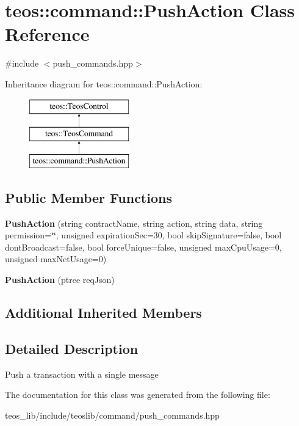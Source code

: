 \hypertarget{classteos_1_1command_1_1_push_action}{}\section{teos\+:\+:command\+:\+:Push\+Action Class Reference}
\label{classteos_1_1command_1_1_push_action}


{\ttfamily \#include $<$push\+\_\+commands.\+hpp$>$}

Inheritance diagram for teos\+:\+:command\+:\+:Push\+Action\+:\begin{figure}[H]
\begin{center}
\leavevmode
\includegraphics[height=3.000000cm]{classteos_1_1command_1_1_push_action}
\end{center}
\end{figure}
\subsection*{Public Member Functions}
\begin{DoxyCompactItemize}
\item 
\mbox{\label{classteos_1_1command_1_1_push_action_a97565647ccfdf55a8e0e5a6d2ed25d32}} 
{\bfseries Push\+Action} (string contract\+Name, string action, string data, string permission=\char`\"{}\char`\"{}, unsigned expiration\+Sec=30, bool skip\+Signature=false, bool dont\+Broadcast=false, bool force\+Unique=false, unsigned max\+Cpu\+Usage=0, unsigned max\+Net\+Usage=0)
\item 
\mbox{\label{classteos_1_1command_1_1_push_action_a8bca4e4fa0586c2d2242a3a50e25cc07}} 
{\bfseries Push\+Action} (ptree req\+Json)
\end{DoxyCompactItemize}
\subsection*{Additional Inherited Members}


\subsection{Detailed Description}
Push a transaction with a single message 

The documentation for this class was generated from the following file\+:\begin{DoxyCompactItemize}
\item 
teos\+\_\+lib/include/teoslib/command/push\+\_\+commands.\+hpp\end{DoxyCompactItemize}
